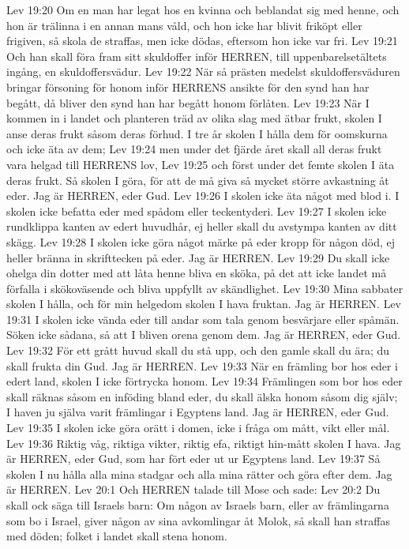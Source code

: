Lev 19:20  Om en man har legat hos en kvinna och beblandat sig med henne, och hon är trälinna i en annan mans våld, och hon icke har blivit friköpt eller frigiven, så skola de straffas, men icke dödas, eftersom hon icke var fri.
Lev 19:21  Och han skall föra fram sitt skuldoffer inför HERREN, till uppenbarelsetältets ingång, en skuldoffersvädur.
Lev 19:22  När så prästen medelst skuldoffersväduren bringar försoning för honom inför HERRENS ansikte för den synd han har begått, då bliver den synd han har begått honom förlåten.
Lev 19:23  När I kommen in i landet och planteren träd av olika slag med ätbar frukt, skolen I anse deras frukt såsom deras förhud. I tre år skolen I hålla dem för oomskurna och icke äta av dem;
Lev 19:24  men under det fjärde året skall all deras frukt vara helgad till HERRENS lov,
Lev 19:25  och först under det femte skolen I äta deras frukt. Så skolen I göra, för att de må giva så mycket större avkastning åt eder. Jag är HERREN, eder Gud.
Lev 19:26  I skolen icke äta något med blod i. I skolen icke befatta eder med spådom eller teckentyderi.
Lev 19:27  I skolen icke rundklippa kanten av edert huvudhår, ej heller skall du avstympa kanten av ditt skägg.
Lev 19:28  I skolen icke göra något märke på eder kropp för någon död, ej heller bränna in skrifttecken på eder. Jag är HERREN.
Lev 19:29  Du skall icke ohelga din dotter med att låta henne bliva en sköka, på det att icke landet må förfalla i skökoväsende och bliva uppfyllt av skändlighet.
Lev 19:30  Mina sabbater skolen I hålla, och för min helgedom skolen I hava fruktan. Jag är HERREN.
Lev 19:31  I skolen icke vända eder till andar som tala genom besvärjare eller spåmän. Söken icke sådana, så att I bliven orena genom dem. Jag är HERREN, eder Gud.
Lev 19:32  För ett grått huvud skall du stå upp, och den gamle skall du ära; du skall frukta din Gud. Jag är HERREN.
Lev 19:33  När en främling bor hos eder i edert land, skolen I icke förtrycka honom.
Lev 19:34  Främlingen som bor hos eder skall räknas såsom en inföding bland eder, du skall älska honom såsom dig själv; I haven ju själva varit främlingar i Egyptens land. Jag är HERREN, eder Gud.
Lev 19:35  I skolen icke göra orätt i domen, icke i fråga om mått, vikt eller mål.
Lev 19:36  Riktig våg, riktiga vikter, riktig efa, riktigt hin-mått skolen I hava. Jag är HERREN, eder Gud, som har fört eder ut ur Egyptens land.
Lev 19:37  Så skolen I nu hålla alla mina stadgar och alla mina rätter och göra efter dem. Jag är HERREN.
Lev 20:1  Och HERREN talade till Mose och sade:
Lev 20:2  Du skall ock säga till Israels barn: Om någon av Israels barn, eller av främlingarna som bo i Israel, giver någon av sina avkomlingar åt Molok, så skall han straffas med döden; folket i landet skall stena honom.
